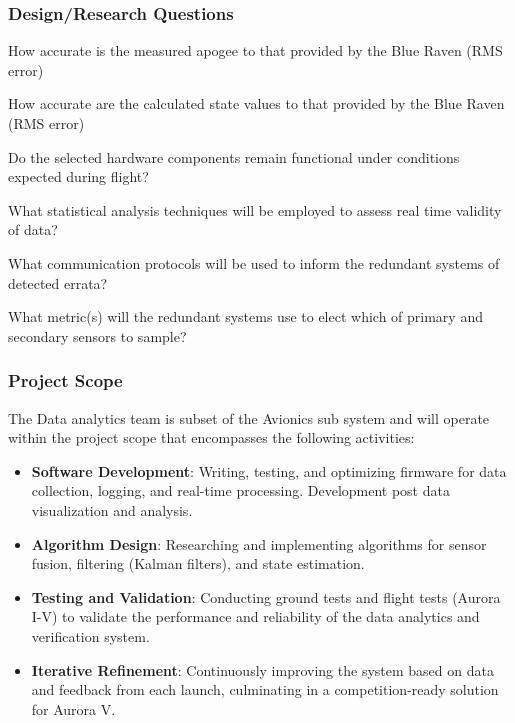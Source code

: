 \subsubsection{Design/Research Questions}
\begin{questions}
  \item How accurate is the measured apogee to that provided by the Blue Raven (RMS error) \question{}
  \item How accurate are the calculated state values to that provided by the Blue Raven (RMS error) \question{}
  \item Do the selected hardware components remain functional under conditions expected during flight? \question{}
  \item What statistical analysis techniques will be employed to assess real time validity of data? \question{} \begin{questions}
    \item What communication protocols will be used to inform the redundant systems of detected errata?
    \item What metric(s) will the redundant systems use to elect which of primary and secondary sensors to sample?
  \end{questions}
\end{questions}

\subsubsection{Project Scope}
The Data analytics team is subset of the Avionics sub system and will operate within the project scope that encompasses the following activities: 
\begin{itemize}
  \item \textbf{Software Development}: Writing, testing, and optimizing firmware for data collection, logging, and real-time processing. Development post data visualization and analysis. 
  \item \textbf{Algorithm Design}: Researching and implementing algorithms for sensor fusion, filtering (Kalman filters), and state estimation. 
  \item \textbf{Testing and Validation}: Conducting ground tests and flight tests (Aurora I-V) to validate the performance and reliability of the data analytics and verification system. 
  \item \textbf{Iterative Refinement}: Continuously improving the system based on data and feedback from each launch, culminating in a competition-ready solution for Aurora V.
\end{itemize}


